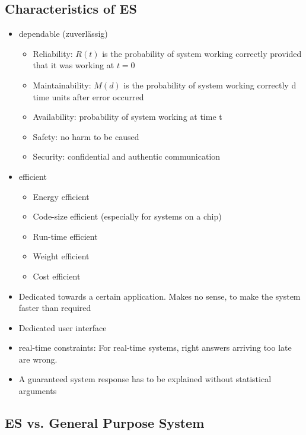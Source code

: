 \subsection{Characteristics of ES}
\begin{itemize}[noitemsep]
\item dependable (zuverl\"assig)
\begin{itemize}[noitemsep]
\item Reliability: $R(t)$ is the probability of system working correctly provided that it was working at $t=0$
\item Maintainability: $M(d) $ is the probability of system working correctly d time units after error occurred
\item Availability: probability of system working at time t
\item Safety: no harm to be caused
\item Security: confidential and authentic communication
\end{itemize}
\item efficient
\begin{itemize}[noitemsep]
\item Energy efficient
\item Code-size efficient (especially for systems on a chip)
\item Run-time efficient
\item Weight efficient
\item Cost efficient
\end{itemize}
\item Dedicated towards a certain application. Makes no sense, to make the system faster than required
\item Dedicated user interface
\item real-time constraints: For real-time systems, right answers arriving too late are wrong.
\item A guaranteed system response has to be explained without statistical arguments
\end{itemize}


\subsection{ES vs. General Purpose System}

